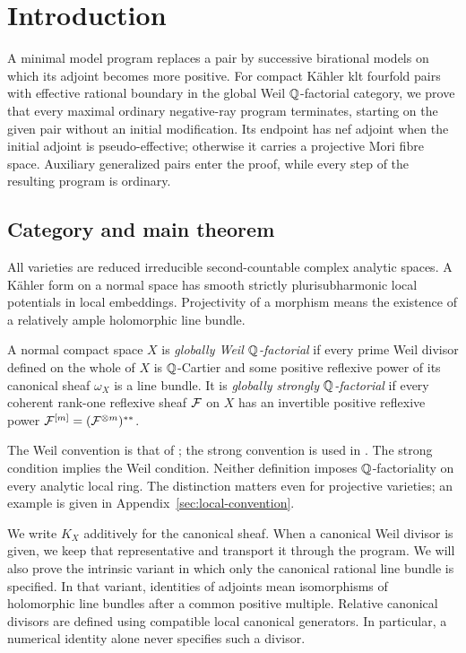\section{Introduction}\label{sec:introduction}

A minimal model program replaces a pair by successive birational models
on which its adjoint becomes more positive. For compact Kähler klt fourfold
pairs with effective rational boundary in the global Weil $\mathbb Q$-factorial
category, we prove that every maximal ordinary negative-ray program
terminates, starting on the given pair without an initial modification.
Its endpoint has nef adjoint when the initial adjoint is pseudo-effective;
otherwise it carries a projective Mori fibre space. Auxiliary generalized
pairs enter the proof, while every step of the resulting program is ordinary.

\subsection{Category and main theorem}

All varieties are reduced irreducible second-countable complex analytic
spaces. A Kähler form on a normal space has smooth strictly
plurisubharmonic local potentials in local embeddings. Projectivity of a
morphism means the existence of a relatively ample holomorphic line
bundle.

\begin{definition}\label{def:global-factoriality}\label{def:strong-factoriality}
A normal compact space $X$ is \emph{globally Weil $\mathbb Q$-factorial} if
every prime Weil divisor defined on the whole of $X$ is $\mathbb Q$-Cartier and
some positive reflexive power of its canonical sheaf $\omega_X$ is a line
bundle. It is \emph{globally strongly $\mathbb Q$-factorial} if every coherent
rank-one reflexive sheaf $\mathcal F$ on $X$ has an invertible positive reflexive
power $\mathcal F^{[m]}=(\mathcal F^{\otimes m})^{**}$.
\end{definition}

The Weil convention is that of \cite[Definition~2.1]{DHY2023};
the strong convention is used in \cite[Section~2]{HX2026}.
The strong condition implies the Weil
condition. Neither definition imposes $\mathbb Q$-factoriality on every analytic
local ring. The distinction matters even for projective varieties; an
example is given in Appendix~\ref{sec:local-convention}.

We write $K_X$ additively for the canonical sheaf. When a canonical Weil
divisor is given, we keep that representative and transport it through
the program. We will also prove the intrinsic variant in which only the
canonical rational line bundle is specified. In that variant, identities
of adjoints mean isomorphisms of holomorphic line bundles after a common
positive multiple. Relative canonical divisors are defined using
compatible local canonical generators. In particular, a numerical
identity alone never specifies such a divisor.

